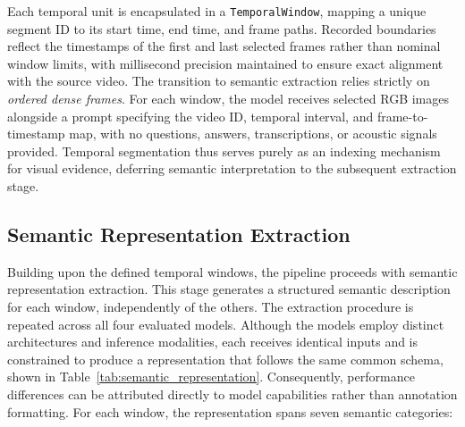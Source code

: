 Each temporal unit is encapsulated in a \texttt{TemporalWindow}, mapping a unique segment ID to its start time, end time, and frame paths. Recorded boundaries reflect the timestamps of the first and last selected frames rather than nominal window limits, with millisecond precision maintained to ensure exact alignment with the source video.
The transition to semantic extraction relies strictly on \textit{ordered dense frames}. For each window, the model receives selected RGB images alongside a prompt specifying the video ID, temporal interval, and frame-to-timestamp map, with no questions, answers, transcriptions, or acoustic signals provided. Temporal segmentation thus serves purely as an indexing mechanism for visual evidence, deferring semantic interpretation to the subsequent extraction stage.
\subsection*{Semantic Representation Extraction}
Building upon the defined temporal windows, the pipeline proceeds with semantic representation extraction. This stage generates a structured semantic description for each window, independently of the others. The extraction procedure is repeated across all four evaluated models. Although the models employ distinct architectures and inference modalities, each receives identical inputs and is constrained to produce a representation that follows the same common schema, shown in Table~\ref{tab:semantic_representation}. Consequently, performance differences can be attributed directly to model capabilities rather than annotation formatting.
For each window, the representation spans seven semantic categories:
